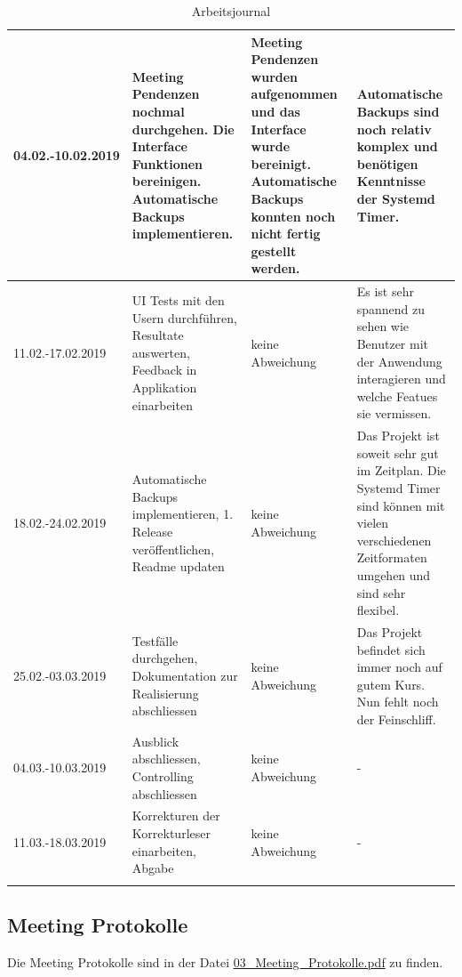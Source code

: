 \begin{landscape}
\begin{longtable}{|p{2cm}|p{5cm}|p{5cm}|p{7cm}|}
\hline
04.02.-10.02.2019 & Meeting Pendenzen nochmal durchgehen. Die Interface Funktionen bereinigen. Automatische Backups implementieren. & Meeting Pendenzen wurden aufgenommen und das Interface wurde bereinigt. Automatische Backups konnten noch nicht fertig gestellt werden. & Automatische Backups sind noch relativ komplex und benötigen Kenntnisse der Systemd Timer.\\
\hline
11.02.-17.02.2019 & UI Tests mit den Usern durchführen, Resultate auswerten, Feedback in Applikation einarbeiten & keine Abweichung & Es ist sehr spannend zu sehen wie Benutzer mit der Anwendung interagieren und welche Featues sie vermissen.\\
\hline
18.02.-24.02.2019 & Automatische Backups implementieren, 1. Release veröffentlichen, Readme updaten & keine Abweichung & Das Projekt ist soweit sehr gut im Zeitplan. Die Systemd Timer sind können mit vielen verschiedenen Zeitformaten umgehen und sind sehr flexibel.\\
\hline
25.02.-03.03.2019 & Testfälle durchgehen, Dokumentation zur Realisierung abschliessen & keine Abweichung & Das Projekt befindet sich immer noch auf gutem Kurs. Nun fehlt noch der Feinschliff.\\
\hline
04.03.-10.03.2019 & Ausblick abschliessen, Controlling abschliessen & keine Abweichung & -\\
\hline
11.03.-18.03.2019 & Korrekturen der Korrekturleser einarbeiten, Abgabe & keine Abweichung & -\\
\hline
\caption{\label{tab:orgc3ff16c}
Arbeitsjournal}
\\
\end{longtable}
\end{landscape}

\subsection{Meeting Protokolle}
\label{sec:orgc2c5a7d}

Die Meeting Protokolle sind in der Datei \href{03\_Meeting\_Protokolle.pdf}{03\_Meeting\_Protokolle.pdf} zu finden.
